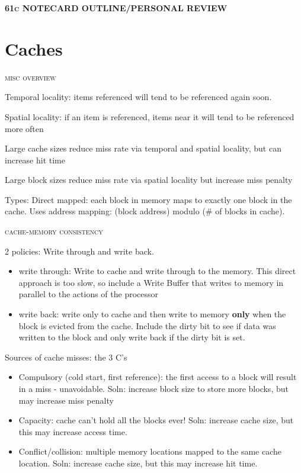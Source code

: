 \documentclass{article}
\begin{document}
\newcommand\codeHighlight[1]{\textcolor[rgb]{1,0,0}{\textbf{#1}}}

\begin{center}\textsc{\textbf{61c NOTECARD OUTLINE/PERSONAL REVIEW}}\end{center} 
\section{Caches} %
\label{sec:caches}

\begin{center}\textsc{misc overview}\end{center} 
Temporal locality: items referenced will tend to be referenced again soon.

Spatial locality: if an item is referenced, items near it will tend to be
referenced more often

Large cache sizes reduce miss rate via temporal and spatial locality, but can increase hit time

Large block sizes reduce miss rate via spatial locality but increase miss penalty

Types:
Direct mapped: each block in memory maps to exactly one block in the cache. Uses address mapping: (block address) modulo (\# of blocks in cache).

\begin{center}\textsc{cache-memory consistency}\end{center} 
2 policies: Write through and write back.

\begin{itemize}
	\item write through: Write to cache and write through to the memory. This direct approach is too slow, so include a Write Buffer that writes to memory in parallel to the actions of the processor
	
	\item write back: write only to cache and then write to memory {\bf only} when the block is evicted from the cache. Include the dirty bit to see if data was written to the block and only write back if the dirty bit is set.
	
\end{itemize}
Sources of cache misses: the 3 C's

\begin{itemize}
	\item Compulsory (cold start, first reference): the first access to a block
	will result in a miss - unavoidable. Soln: increase block size to store 	
	more blocks, but may increase miss penalty
	
	\item Capacity: cache can't hold all the blocks ever! Soln: increase cache 
	size, but this may increase access time.
	
	\item Conflict/collision: multiple memory locations mapped to the same cache location. Soln: increase cache size, but this may increase hit time.
\end{itemize}
\end{document}
